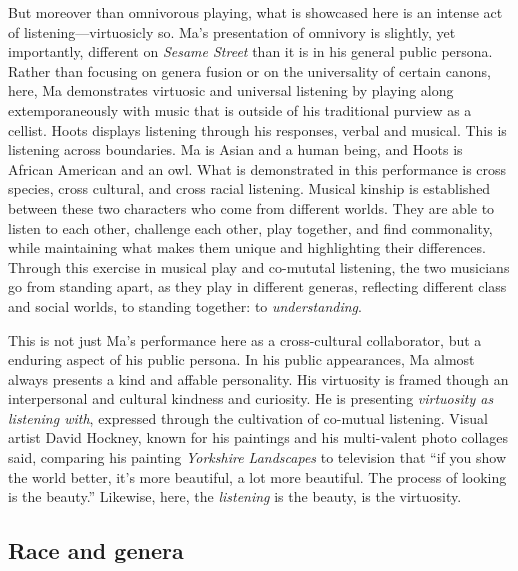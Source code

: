 \documentclass[12pt,letterpaper]{article}
\newcommand{\ses}{\textit{Sesame Street }}
\begin{document}
	But moreover than omnivorous playing, what is showcased here is an 
	intense
	act of listening---virtuosicly so. Ma's presentation of omnivory is 
	slightly, yet importantly, different on \ses than it is in his general
	public persona. Rather than focusing
	on genera fusion or on the universality of certain canons, here, Ma 
	demonstrates virtuosic and universal listening by playing 
	along extemporaneously with music that is outside of his traditional 
	purview as a 
	cellist. Hoots displays listening through his responses, verbal and 
	musical. This is listening across boundaries. Ma is Asian and a human 
	being, and Hoots is African American and an owl. What is demonstrated 
	in this performance is cross species, cross cultural, and cross racial 
	listening. Musical kinship is established between these two characters 
	who come from different worlds. They are able to listen to each other, 
	challenge each other, play together, and find commonality, while 
	maintaining what makes them unique and highlighting their differences. 
	Through this exercise in musical play and co-mututal listening, the two
	musicians go from standing apart, as they play in different generas, 
	reflecting different class and social worlds, to standing together: to 
	\textit{understanding}.

	This is not just Ma's performance here as a cross-cultural collaborator,
	but a enduring aspect of his public persona. In his public appearances,
	Ma almost always presents a kind and affable personality. His virtuosity
	is framed though an interpersonal and cultural kindness and curiosity. 
	He is presenting \textit{virtuosity as listening with}, expressed
	through the
	cultivation of co-mutual listening.
	Visual artist David Hockney, known for his paintings and his 
	multi-valent photo collages said, comparing his painting 
	\textit{Yorkshire 
	Landscapes} to television that ``if you show the world better, it's more
	beautiful, a lot more beautiful. The process of looking is the 
	beauty.''\autocite[100]{Odell} Likewise, here, the \textit{listening} is
	the beauty, is the virtuosity.  


	\subsection*{Race and genera}
\end{document}
